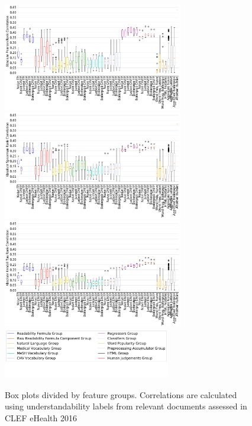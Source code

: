 \documentclass[runningheads,a4paper]{llncs}
\begin{document}
\begin{figure}[th!]
   \centering
   \includegraphics[width=0.70\textwidth]{graphics/box_pearson16_raw_values}
   \includegraphics[width=0.70\textwidth]{graphics/box_spearman16_raw_values}
   \includegraphics[width=0.70\textwidth]{graphics/box_kendalltau16_raw_values}
    \includegraphics[width=0.65\textwidth]{graphics/legendCorr}
    \vspace{-1.cm}
    \caption{Box plots divided by feature groups. Correlations are calculated using understandability labels from relevant documents assessed in CLEF eHealth 2016}
   \label{fig:boxplot_corr_docs_2016}
\end{figure}
\end{document}
